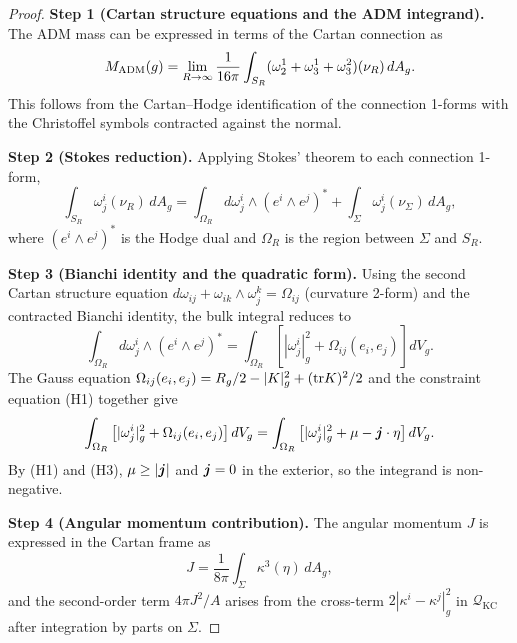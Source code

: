 \begin{proof}
\textbf{Step 1 (Cartan structure equations and the ADM integrand).} The ADM mass can be expressed in terms of the Cartan connection as
\begin{equation}
M_{\mathrm{ADM}}(g) = \lim_{R \to \infty} \frac{1}{16\pi} \int_{S_R} (\omega^1_2 + \omega^1_3 + \omega^2_3)(\nu_R) \, dA_g.
\end{equation}
This follows from the Cartan--Hodge identification of the connection 1-forms with the Christoffel symbols contracted against the normal.

\textbf{Step 2 (Stokes reduction).} Applying Stokes' theorem to each connection 1-form,
\begin{equation}
\int_{S_R} \omega^i_j(\nu_R) \, dA_g = \int_{\Omega_R} d\omega^i_j \wedge (e^i \wedge e^j)^* + \int_{\Sigma} \omega^i_j(\nu_\Sigma) \, dA_g,
\end{equation}
where $(e^i \wedge e^j)^*$ is the Hodge dual and $\Omega_R$ is the region between $\Sigma$ and $S_R$.

\textbf{Step 3 (Bianchi identity and the quadratic form).} Using the second Cartan structure equation $d\omega_{ij} + \omega_{ik} \wedge \omega^k_j = \Omega_{ij}$ (curvature 2-form) and the contracted Bianchi identity, the bulk integral reduces to
\begin{equation}
\int_{\Omega_R} d\omega^i_j \wedge (e^i \wedge e^j)^* = \int_{\Omega_R} \left[ |\omega^i_j|^2_g + \Omega_{ij}(e_i, e_j) \right] dV_g.
\end{equation}
The Gauss equation $\Omega_{ij}(e_i, e_j) = R_g/2 - |K|^2_g + (\mathrm{tr} K)^2/2$ and the constraint equation (H1) together give
\begin{equation}
\int_{\Omega_R} \left[ |\omega^i_j|^2_g + \Omega_{ij}(e_i, e_j) \right] dV_g = \int_{\Omega_R} \left[ |\omega^i_j|^2_g + \mu - \boldsymbol{j} \cdot \eta \right] dV_g.
\end{equation}
By (H1) and (H3), $\mu \geq |\boldsymbol{j}|$ and $\boldsymbol{j} = 0$ in the exterior, so the integrand is non-negative.

\textbf{Step 4 (Angular momentum contribution).} The angular momentum $J$ is expressed in the Cartan frame as
\begin{equation}
J = \frac{1}{8\pi} \int_{\Sigma} \kappa^3(\eta) \, dA_g,
\end{equation}
and the second-order term $4\pi J^2/A$ arises from the cross-term $2|\kappa^i - \kappa^j|^2_g$ in $\mathcal{Q}_{\mathrm{KC}}$ after integration by parts on $\Sigma$.


\end{proof}
